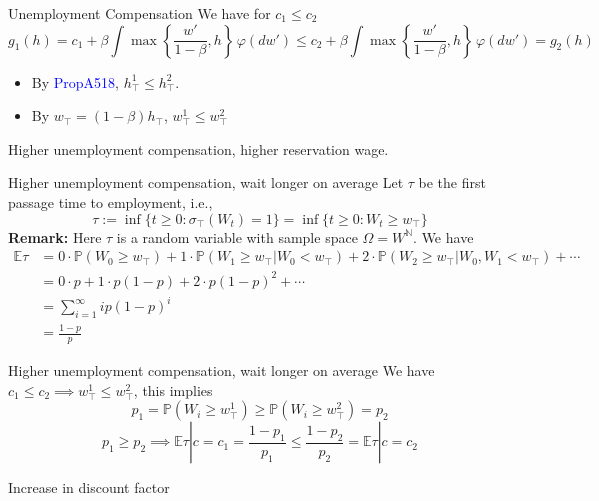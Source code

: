 \begin{frame}{Unemployment Compensation}
    We have for $c_1\le c_2$
    $$
    g_1(h) = c_1 + \beta \int \max\left\{\frac{w'}{1-\beta}, h\right\}\,\varphi(dw')\le c_2 + \beta \int \max\left\{\frac{w'}{1-\beta}, h\right\}\,\varphi(dw') = g_2(h)
    $$
\begin{itemize}
    \item By \textcolor{blue}{PropA518}, $h^1_\top \le h^2_\top$.
    \item By $w_\top = (1-\beta)h_\top$, $w^1_\top\le w^2_\top$
\end{itemize}
Higher unemployment compensation, higher reservation wage.
\end{frame}

\begin{frame}{Higher unemployment compensation, wait longer on average}
Let $\tau$ be the first passage time to employment, i.e.,
$$
\tau:= \inf\{t\ge 0: \sigma_\top (W_t) = 1\} = \inf\{t\ge 0: W_t\ge w_\top\}
$$
\textbf{Remark:} Here $\tau$ is a random variable with sample space $\Omega = W^\mathbb{N}$. We have
\begin{align*}
    \mathbb{E}\tau  &= 0\cdot \mathbb{P}(W_0\ge w_\top) + 1\cdot \mathbb{P}(W_1\ge w_\top
    |W_0< w_\top)+ 2\cdot \mathbb{P}(W_2\ge w_\top|W_0,W_1<w_\top)+\cdots\\
    &= 0\cdot p + 1\cdot p(1-p) + 2\cdot p(1-p)^2 + \cdots\\
    &= \sum_{i=1}^\infty ip(1-p)^i\tag{mean of Geometric distribution}\\
    &=\frac{1-p}{p}
\end{align*}
\end{frame}

\begin{frame}{Higher unemployment compensation, wait longer on average}
    We have $c_1\le c_2\implies w_\top^1\le w_\top^2$, this implies
    $$
    p_1 = \mathbb{P}(W_i\ge w^1_\top)\ge \mathbb{P}(W_i\ge w_\top^2) = p_2
    $$
    $$
    p_1\ge p_2\implies\mathbb{E}\tau|c=c_1 = \frac{1-p_1}{p_1} \le  \frac{1-p_2}{p_2} = \mathbb{E}\tau|c=c_2
    $$
\end{frame}

\begin{frame}{Increase in discount factor}
    
\end{frame}

